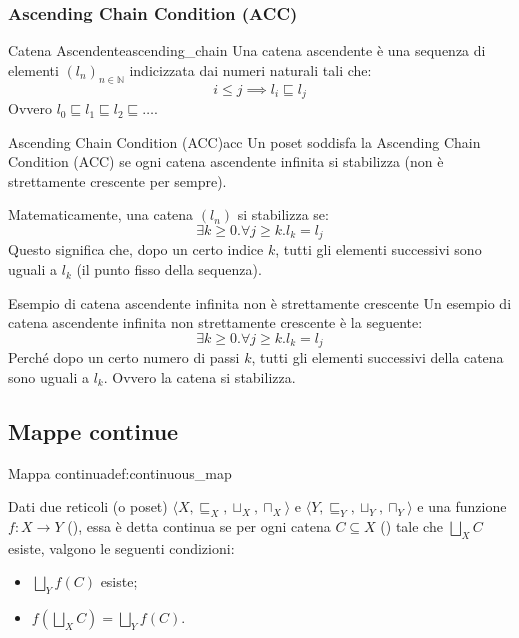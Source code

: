 \subsubsection{Ascending Chain Condition (ACC)}

\begin{definizione}{Catena Ascendente}{ascending_chain}
Una catena ascendente è una sequenza di elementi $(l_n)_{n \in \mathbb{N}}$
indicizzata dai numeri naturali tali che:
\[
i \le j \implies l_i \sqsubseteq l_j
\]
Ovvero $l_0 \sqsubseteq l_1 \sqsubseteq l_2 \sqsubseteq \dots$.
\end{definizione}

\begin{definizione}{Ascending Chain Condition (ACC)}{acc}
Un poset soddisfa la Ascending Chain Condition (ACC) se ogni catena ascendente
infinita si stabilizza (non è strettamente crescente per sempre).

Matematicamente, una catena $(l_n)$ si stabilizza se:
\[
\exists k \ge 0 . \forall j \ge k . l_k = l_j
\]
Questo significa che, dopo un certo indice $k$, tutti gli elementi successivi
sono uguali a $l_k$ (il punto fisso della sequenza).
\end{definizione}

\begin{esempio}{Esempio di catena ascendente infinita non è strettamente crescente}{}
Un esempio di catena ascendente infinita non strettamente crescente è la seguente:
\[
 \exists k \ge 0 . \forall j \ge k . l_k = l_j
\]
Perché dopo un certo numero di passi $k$, tutti gli elementi successivi
della catena sono uguali a $l_k$. Ovvero la catena si stabilizza.
\end{esempio}

\subsection{Mappe continue}

\begin{definizione}{Mappa continua}{def:continuous_map}

Dati due reticoli (o poset) $\langle X, \sqsubseteq_X, \sqcup_X, \sqcap_X \rangle$ e
$\langle Y, \sqsubseteq_Y, \sqcup_Y, \sqcap_Y \rangle$ e una funzione
$f: X \to Y$ (), essa è detta continua se per ogni catena
$C \subseteq X$ () tale che $\bigsqcup_X C$ esiste, valgono
le seguenti condizioni:
\begin{itemize}
    \item $\bigsqcup_Y f(C)$ esiste;
    \item $f(\bigsqcup_X C) = \bigsqcup_Y f(C)$.
\end{itemize}

\end{definizione}

